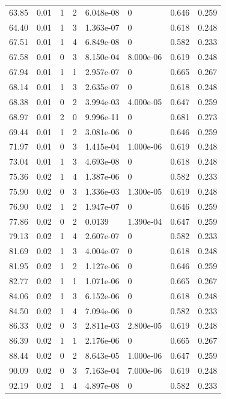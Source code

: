 \documentclass[preview]{standalone}
\begin{document}
{{{\begin{tabular}{L{1.2cm}C{1.2cm} C{0.3cm}C{0.5cm} C{1.4cm}C{1.4cm} C{1.4cm}C{1.4cm}}
  63.85  &  0.01  & 1     &  2 &  6.048e-08  & 0  & 0.646 &  0.259   \\ 
  64.40  &  0.01  & 1     &  3 &  1.363e-07  & 0  & 0.618 &  0.248   \\ 
  67.51  &  0.01  & 1     &  4 &  6.849e-08  & 0  & 0.582 &  0.233   \\ 
  67.58  &  0.01  & 0     &  3 &  8.150e-04  & 8.000e-06  & 0.619 &  0.248   \\ 
  67.94  &  0.01  & 1     &  1 &  2.957e-07  & 0  & 0.665 &  0.267   \\ 
  68.14  &  0.01  & 1     &  3 &  2.635e-07  & 0  & 0.618 &  0.248   \\ 
  68.38  &  0.01  & 0     &  2 &  3.994e-03  & 4.000e-05  & 0.647 &  0.259   \\ 
  68.97  &  0.01  & 2     &  0 &  9.996e-11  & 0  & 0.681 &  0.273   \\ 
  69.44  &  0.01  & 1     &  2 &  3.081e-06  & 0  & 0.646 &  0.259   \\ 
  71.97  &  0.01  & 0     &  3 &  1.415e-04  & 1.000e-06  & 0.619 &  0.248   \\ 
  73.04  &  0.01  & 1     &  3 &  4.693e-08  & 0  & 0.618 &  0.248   \\ 
  75.36  &  0.02  & 1     &  4 &  1.387e-06  & 0  & 0.582 &  0.233   \\ 
  75.90  &  0.02  & 0     &  3 &  1.336e-03  & 1.300e-05  & 0.619 &  0.248   \\ 
  76.90  &  0.02  & 1     &  2 &  1.947e-07  & 0  & 0.646 &  0.259   \\ 
  77.86  &  0.02  & 0     &  2 &  0.0139  & 1.390e-04  & 0.647 &  0.259   \\ 
  79.13  &  0.02  & 1     &  4 &  2.607e-07  & 0  & 0.582 &  0.233   \\ 
  81.69  &  0.02  & 1     &  3 &  4.004e-07  & 0  & 0.618 &  0.248   \\ 
  81.95  &  0.02  & 1     &  2 &  1.127e-06  & 0  & 0.646 &  0.259   \\ 
  82.77  &  0.02  & 1     &  1 &  1.071e-06  & 0  & 0.665 &  0.267   \\ 
  84.06  &  0.02  & 1     &  3 &  6.152e-06  & 0  & 0.618 &  0.248   \\ 
  84.50  &  0.02  & 1     &  4 &  7.094e-06  & 0  & 0.582 &  0.233   \\ 
  86.33  &  0.02  & 0     &  3 &  2.811e-03  & 2.800e-05  & 0.619 &  0.248   \\ 
  86.39  &  0.02  & 1     &  1 &  2.176e-06  & 0  & 0.665 &  0.267   \\ 
  88.44  &  0.02  & 0     &  2 &  8.643e-05  & 1.000e-06  & 0.647 &  0.259   \\ 
  90.09  &  0.02  & 0     &  3 &  7.163e-04  & 7.000e-06  & 0.619 &  0.248   \\ 
  92.19  &  0.02  & 1     &  4 &  4.897e-08  & 0  & 0.582 &  0.233   \\ 
\hline 
\end{tabular} 

}}}
\end{document}
